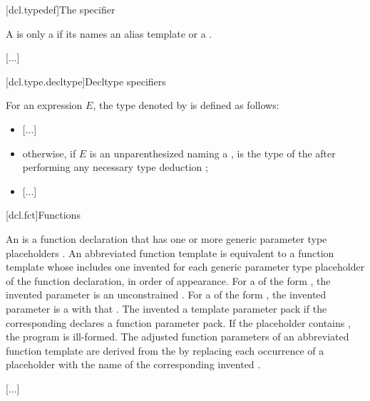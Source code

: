 \documentclass{wg21}
\begin{document}
[dcl.typedef]{The  specifier}%


\pnum
{}%
A  is only a 
if its  names
an alias template or a .
\begin{note}
    \textcolor{noteclr}{[...]}
\end{note}

[dcl.type.decltype]{Decltype specifiers}%
%

%
For an expression $E$, the type denoted by  is defined as follows:
\begin{itemize}
\item \textcolor{noteclr}{[...]}

\item otherwise, if $E$ is an unparenthesized 
naming a  ,
 is the type of the\linebreak
{}
after performing any necessary
type deduction ;

\item \textcolor{noteclr}{[...]}
\end{itemize}

[dcl.fct]{Functions}%

\pnum
An 
is a function declaration that has
one or more generic parameter type placeholders .
An abbreviated function template is equivalent to
a function template 
whose  includes
one invented 
for each generic parameter type placeholder
of the function declaration, in order of appearance.
For a  of the form ,
the invented parameter is
an unconstrained .
For a  of the form
 ,
the invented parameter is a  with
that .
The invented 
a template parameter pack
if the corresponding 
declares a function parameter pack.
If the placeholder contains ,
the program is ill-formed.
The adjusted function parameters of an abbreviated function template
are derived from the  by
replacing each occurrence of a placeholder with
the name of the corresponding invented .
\begin{example}
    \textcolor{noteclr}{[...]}
\end{example}
\end{document}
